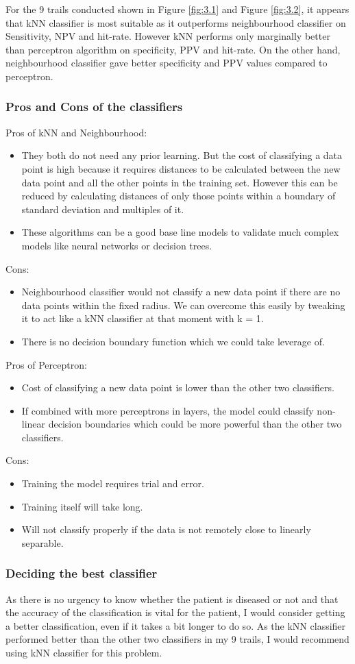 \documentclass[a4paper,11pt]{article}
\begin{document}
For the 9 trails conducted shown in Figure \ref{fig:3.1} and Figure \ref{fig:3.2}, it appears that kNN classifier is most suitable as it outperforms neighbourhood classifier on Sensitivity, NPV and hit-rate. However kNN performs only marginally better than perceptron algorithm on specificity, PPV and hit-rate. On the other hand, neighbourhood classifier gave better specificity and PPV values compared to perceptron.

\subsubsection{Pros and Cons of the classifiers}
Pros of kNN and Neighbourhood:
\begin{itemize}
  \item They both do not need any prior learning. But the cost of classifying a data point is high because it requires distances to be calculated between the new data point and all the other points in the training set. However this can be reduced by calculating distances of only those points within a boundary of standard deviation and multiples of it.
  \item These algorithms can be a good base line models to validate much complex models like neural networks or decision trees.
\end{itemize}
Cons:
\begin{itemize}
  \item Neighbourhood classifier would not classify a new data point if there are no data points within the fixed radius. We can overcome this easily by tweaking it to act like a kNN classifier at that moment with k = 1.
  \item There is no decision boundary function which we could take leverage of.
\end{itemize}
Pros of Perceptron:
\begin{itemize}
  \item Cost of classifying a new data point is lower than the other two classifiers.
  \item If combined with more perceptrons in layers, the model could classify non-linear decision boundaries which could be more powerful than the other two classifiers.
\end{itemize}
Cons:
\begin{itemize}
  \item Training the model requires trial and error.
  \item Training itself will take long.
  \item Will not classify properly if the data is not remotely close to linearly separable.
\end{itemize}

\subsubsection{Deciding the best classifier}
As there is no urgency to know whether the patient is diseased or not and that the accuracy of the classification is vital for the patient, I would consider getting a better classification, even if it takes a bit longer to do so. As the kNN classifier performed better than the other two classifiers in my 9 trails, I would recommend using kNN classifier for this problem.
\end{document}
